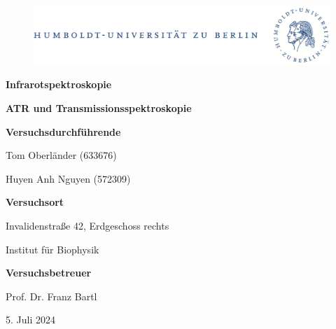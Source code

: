 \documentclass[10pt,a4paper]{article}
\begin{document}
	
	\begin{titlepage}
		\begin{center}
			\begin{figure}[h!tbp]
				\includegraphics[width=\linewidth]{HUlogo.PNG}
			\end{figure}
			\vspace*{2 cm}
			
			\textcolor{Bluetitle}{\textbf{\huge Infrarotspektroskopie}}\par
			\vspace*{0.5cm}
			\textcolor{softbluetitle}{\textbf{\Large ATR und Transmissionsspektroskopie}}\par
			
			\vspace*{2cm}
			
			\textcolor{Greyish}{\textbf{Versuchsdurchführende}}\par
			\textcolor{Greyish}{Tom Oberländer (633676)}\par
			\textcolor{Greyish}{Huyen Anh Nguyen (572309)}\par
			
			\vspace*{0.5cm}
			\textcolor{Greyish}{\textbf{Versuchsort}}\par
			\textcolor{Greyish}{Invalidenstraße 42, Erdgeschoss rechts}\par
			\textcolor{Greyish}{Institut für Biophysik}\par
			\vspace*{0.5cm}
			\textcolor{Greyish}{\textbf{Versuchsbetreuer}}\par
			\textcolor{Greyish}{Prof. Dr. Franz Bartl}\par
			
			\vspace*{2 cm}
			
			\textcolor{Greyish}{5. Juli 2024}\par
			
			
			
			
		\end{center}
	\end{titlepage}
	
	\tableofcontents
	
\end{document}
